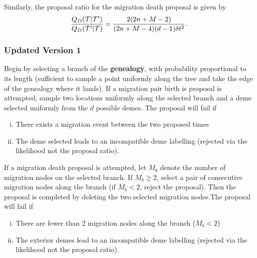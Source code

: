 	Similarly, the proposal ratio for the migration death proposal is given by
		\[
			\frac{Q_D( \mathcal{T} | \mathcal{T}')}{Q_D (\mathcal{T}' | \mathcal{T})} = \frac{2 (2n+M-2)}{(2n + M - 4) (d-1) \delta t^2}.
		\]

\subsubsection{Updated Version 1}
	Begin by selecting a branch of the \textbf{genealogy}, with probability proportional to its length (sufficient to sample a point uniformly along the tree and take the edge of the genealogy where it lands). If a migration pair birth is proposal is attempted, sample two locations uniformly along the selected branch and a deme selected uniformly from the $d$ possible demes. The proposal will fail if
	
	\begin{enumerate}[(i)]
		\item There exists a migration event between the two proposed times
		\item The deme selected leads to an incompatible deme labelling (rejected via the likelihood not the proposal ratio).
	\end{enumerate}
	
	If a migration death proposal is attempted, let $M_b$ denote the number of migration nodes on the selected branch. If $M_b \geq 2$, select a pair of consecutive migration nodes along the branch (if $M_b < 2$, reject the proposal). Then the proposal is completed by deleting the two selected migration nodes.The proposal will fail if
	
	\begin{enumerate}[(i)]
		\item There are fewer than 2 migration nodes along the branch ($M_b < 2$) 
		\item The exterior demes lead to an incompatible deme labelling (rejected via the likelihood not the proposal ratio).
	\end{enumerate}
	
